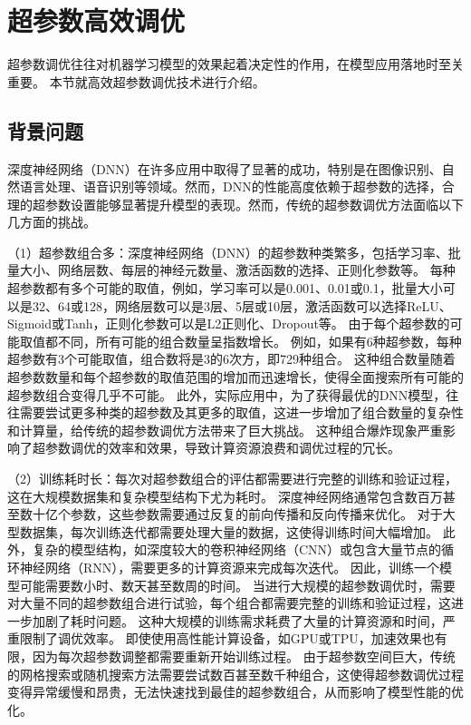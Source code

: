 \section{超参数高效调优}

超参数调优往往对机器学习模型的效果起着决定性的作用，在模型应用落地时至关重要。
本节就高效超参数调优技术进行介绍。

\subsection{背景问题}

深度神经网络（DNN）在许多应用中取得了显著的成功，特别是在图像识别、自然语言处理、语音识别等领域。然而，DNN的性能高度依赖于超参数的选择，合理的超参数设置能够显著提升模型的表现。然而，传统的超参数调优方法面临以下几方面的挑战。

（1）超参数组合多：深度神经网络（DNN）的超参数种类繁多，包括学习率、批量大小、网络层数、每层的神经元数量、激活函数的选择、正则化参数等。
每种超参数都有多个可能的取值，例如，学习率可以是0.001、0.01或0.1，批量大小可以是32、64或128，网络层数可以是3层、5层或10层，激活函数可以选择ReLU、Sigmoid或Tanh，正则化参数可以是L2正则化、Dropout等。
由于每个超参数的可能取值都不同，所有可能的组合数量呈指数增长。
例如，如果有6种超参数，每种超参数有3个可能取值，组合数将是3的6次方，即729种组合。
这种组合数量随着超参数数量和每个超参数的取值范围的增加而迅速增长，使得全面搜索所有可能的超参数组合变得几乎不可能。
此外，实际应用中，为了获得最优的DNN模型，往往需要尝试更多种类的超参数及其更多的取值，这进一步增加了组合数量的复杂性和计算量，给传统的超参数调优方法带来了巨大挑战。
这种组合爆炸现象严重影响了超参数调优的效率和效果，导致计算资源浪费和调优过程的冗长。

（2）训练耗时长：每次对超参数组合的评估都需要进行完整的训练和验证过程，这在大规模数据集和复杂模型结构下尤为耗时。
深度神经网络通常包含数百万甚至数十亿个参数，这些参数需要通过反复的前向传播和反向传播来优化。
对于大型数据集，每次训练迭代都需要处理大量的数据，这使得训练时间大幅增加。
此外，复杂的模型结构，如深度较大的卷积神经网络（CNN）或包含大量节点的循环神经网络（RNN），需要更多的计算资源来完成每次迭代。
因此，训练一个模型可能需要数小时、数天甚至数周的时间。
当进行大规模的超参数调优时，需要对大量不同的超参数组合进行试验，每个组合都需要完整的训练和验证过程，这进一步加剧了耗时问题。
这种大规模的训练需求耗费了大量的计算资源和时间，严重限制了调优效率。
即使使用高性能计算设备，如GPU或TPU，加速效果也有限，因为每次超参数调整都需要重新开始训练过程。
由于超参数空间巨大，传统的网格搜索或随机搜索方法需要尝试数百甚至数千种组合，这使得超参数调优过程变得异常缓慢和昂贵，无法快速找到最佳的超参数组合，从而影响了模型性能的优化。

